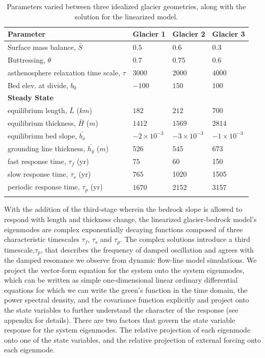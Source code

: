 \documentclass[tc, manuscript]{copernicus}
\begin{document}
\begin{table}[h]
    \begin{tabular}{llll}
        \hline
        \bf{Parameter} & \bf{Glacier 1} & \bf{Glacier 2} & \bf{Glacier 3} \\
        \hline
        Surface mass balance, $\bar{S}$ & $0.5$ & $0.6$ & $0.3$ \\
        Buttressing, $\theta$ & $0.7$ &  $0.75$ & $0.6$ \\
        asthenosphere relaxation time scale, $\tau$ & $3000$ & $2000$ & $4000$ \\
        Bed elev. at divide, $b_0$ & $-100$ & $150$ & $100$  \\
        \hline
        \bf{Steady State} \\
        \hline
        equilibrium length, $\bar{L}$ ($km$) &  $182$  & $212$ & $700$ \\
        equilibrium thickness, $\bar{H}$ ($m$) & $1412$ & $1569$ & $2814$ \\
         equilibrium bed slope, $\bar{b_x}$ & $-2 \times 10^{-3}$ & $-3 \times 10^{-3}$ & $-1 \times 10^{-3}$ \\
        grounding line thickness, $\bar{h_g}$ ($m$) & $526$ & $545$ & $673$ \\
        fast response time, $\tau_f$ (yr) & $75$ & 60 & 150 \\
        slow response time, $\tau_s$ (yr) & $765$ & 1020 & 1505 \\
        periodic response time, $\tau_p$ (yr) & $1670$ & 2152 & 3157 \\
        \hline
        \\
        
    \end{tabular}
    
    \caption{Parameters varied between three idealized glacier geometries, along with the solution for the linearized model.}
\end{table}

With the addition of the third-stage wherein the bedrock slope is allowed to respond with length and thickness change, the linearized glacier-bedrock model's eigenmodes are complex exponentially decaying functions composed of three characteristic timescales $\tau_f$, $\tau_s$ and $\tau_p$. The complex solutions introduce a third timescale,$\tau_p$, that describes the frequency of damped oscillation and agrees with the damped resonance we observe from dynamic flow-line model simulations. We project the vector-form equation for the system onto the system eigenmodes, which can be written as simple one-dimensional linear ordinary differential equations for which we can write the green's function in the time domain, the power spectral density, and the covariance function explicitly and project onto the state variables to further understand the character of the response (see appendix for details). There are two factors that govern the state variable response for the system eigenmodes. The relative projection of each eigenmode onto one of the state variables, and the relative projection of external forcing onto each eigenmode.
\end{document}
